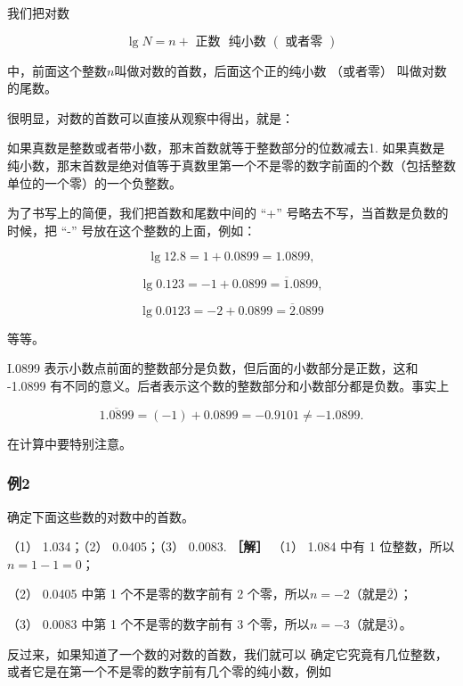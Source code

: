 我们把对数

\[
\lg N = n + \text{ 正数 } \text{ 纯小数 } (\text{ 或者零 })
\]

中，前面这个整数\(n\)叫做对数的首数，后面这个正的纯小数 （或者零）
叫做对数的尾数。

很明显，对数的首数可以直接从观察中得出，就是：

如果真数是整数或者带小数，那末首数就等于整数部分的位数减去1.
如果真数是纯小数，那末首数是绝对值等于真数里第一个不是零的数字前面的个数（包括整数单位的一个零）的一个负整数。

为了书写上的简便，我们把首数和尾数中间的 ``+''
号略去不写，当首数是负数的时候，把 ``-'' 号放在这个整数的上面，例如：

\[
\lg 12.8 = 1 + 0.0899 = 1.0899,
\]

\[
\lg 0.123 = - 1 + 0.0899 = \overline {{1}}. 0899,
\]

\[
\lg 0.0123 = - 2 + 0.0899 = \overline {{2}}. 0899
\]

等等。

 I.0899
表示小数点前面的整数部分是负数，但后面的小数部分是正数，这和 -1.0899
有不同的意义。后者表示这个数的整数部分和小数部分都是负数。事实上

\[
\overline {{1.0899}} = (- 1) + 0.0899 = - 0.9101 \neq - 1.0899.
\]

在计算中要特别注意。

\subsubsection{例2}

确定下面这些数的对数中的首数。

（1） 1.034；（2） 0.0405；（3） 0.0083. \textbf{［解］} （1） 1.084
中有 1 位整数，所以\(n = 1 - 1 = 0\)；

（2） 0.0405 中第 1 个不是零的数字前有 2
个零，所以\(n = -2\)（就是\(\overline{2}\)）；

（3） 0.0083 中第 1 个不是零的数字前有 3
个零，所以\(n = -3\)（就是\(\overline{3}\)）。

反过来，如果知道了一个数的对数的首数，我们就可以
确定它究竟有几位整数，或者它是在第一个不是零的数字前有几个零的纯小数，例如

{\centering
\small\setlength{\tabcolsep}{3pt}%
\par
}

